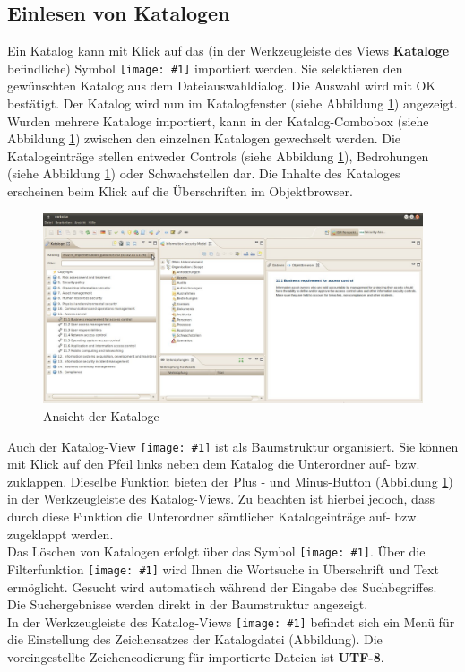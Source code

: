 \documentclass[a4paper,10pt]{book}
\newcommand{\icon}[1]{\texttt{[image: \#1]}}
\begin{document}
\subsection{Einlesen von Katalogen}
Ein Katalog kann mit Klick auf das (in der Werkzeugleiste des Views
\textbf{Kataloge} befindliche) Symbol
\icon{Icon/Oeffnen.png} importiert werden. Sie
selektieren den gewünschten Katalog aus dem Dateiauswahldialog. Die Auswahl wird
mit OK bestätigt. Der Katalog wird nun im Katalogfenster (siehe Abbildung
\ref{Ansicht der Kataloge}) angezeigt. Wurden mehrere Kataloge importiert, kann
in der Katalog-Combobox (siehe Abbildung \ref{Ansicht der Kataloge}) zwischen
den einzelnen Katalogen gewechselt werden. Die Katalogeinträge stellen entweder
Controls (siehe Abbildung \ref{Ansicht der Kataloge}), Bedrohungen (siehe
Abbildung \ref{Ansicht der Kataloge}) oder Schwachstellen dar. Die Inhalte des
Kataloges erscheinen beim Klick auf die Überschriften im Objektbrowser.
\begin{figure}[htb!]
  \centering
  \includegraphics[scale=.25]{Screenshot/Kataloge_screenshot.jpg}
  \caption{\label{Ansicht der Kataloge} Ansicht der Kataloge}
\end{figure}
\newline
Auch der Katalog-View \icon{Icon/Control_Kataloge.png} ist als Baumstruktur organisiert. Sie können mit Klick auf den Pfeil links neben dem Katalog die
Unterordner auf- bzw. zuklappen. Dieselbe Funktion bieten der Plus - und Minus-Button (Abbildung \ref{Ansicht der Kataloge}) in der Werkzeugleiste des Katalog-Views.
Zu beachten ist hierbei jedoch, dass durch diese Funktion die Unterordner sämtlicher Katalogeinträge auf- bzw. zugeklappt werden.
\newline\\
Das Löschen von Katalogen erfolgt über das Symbol \icon{Icon/Delete.png}. Über die Filterfunktion \icon{Icon/Filter.png} wird Ihnen die Wortsuche in
Überschrift und Text ermöglicht. Gesucht wird automatisch während der Eingabe des Suchbegriffes. Die Suchergebnisse werden direkt in der Baumstruktur angezeigt.
\newline\\
In der Werkzeugleiste des Katalog-Views \icon{Icon/Control_Kataloge.png} befindet sich ein Menü für die Einstellung des Zeichensatzes der Katalogdatei (Abbildung).
Die voreingestellte Zeichencodierung für importierte Dateien ist \textbf{UTF-8}.
\end{document}
